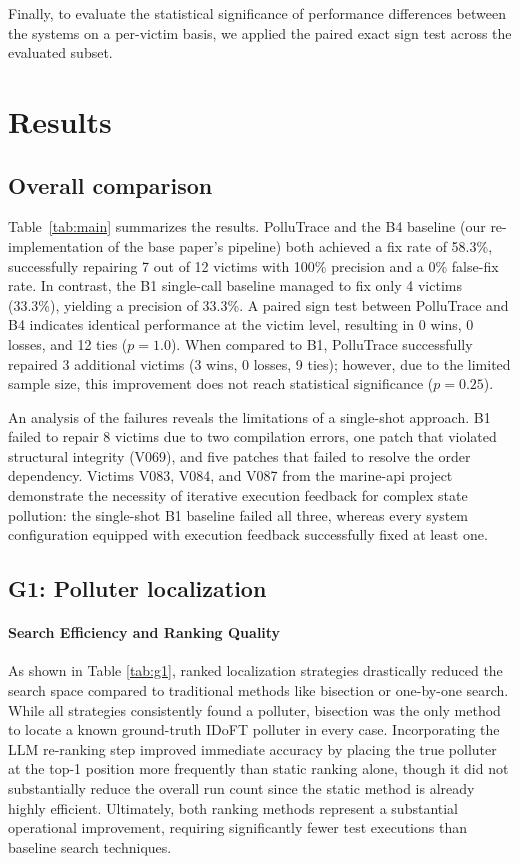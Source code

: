\documentclass[conference]{IEEEtran}
\begin{document}
Finally, to evaluate the statistical significance of performance differences between the systems on a per-victim basis, we applied the paired exact sign test across the evaluated subset.
\section{Results}
\label{sec:results}
\subsection{Overall comparison}

Table~\ref{tab:main} summarizes the results. PolluTrace and the B4 baseline (our re-implementation of the base paper's pipeline) both achieved a fix rate of 58.3\%, successfully repairing 7 out of 12 victims with 100\% precision and a 0\% false-fix rate. In contrast, the B1 single-call baseline managed to fix only 4 victims (33.3\%), yielding a precision of 33.3\%.
A paired sign test between PolluTrace and B4 indicates identical performance at the victim level, resulting in 0 wins, 0 losses, and 12 ties ($p=1.0$). When compared to B1, PolluTrace successfully repaired 3 additional victims (3 wins, 0 losses, 9 ties); however, due to the limited sample size, this improvement does not reach statistical significance ($p=0.25$).

An analysis of the failures reveals the limitations of a single-shot approach. B1 failed to repair 8 victims due to two compilation errors, one patch that violated structural integrity (V069), and five patches that failed to resolve the order dependency. Victims V083, V084, and V087 from the marine-api project demonstrate the necessity of iterative execution feedback for complex state pollution: the single-shot B1 baseline failed all three, whereas every system configuration equipped with execution feedback successfully fixed at least one.
\subsection{G1: Polluter localization}


\paragraph{Search Efficiency and Ranking Quality}
As shown in Table \ref{tab:g1}, ranked localization strategies drastically reduced the search space compared to traditional methods like bisection or one-by-one search. While all strategies consistently found a polluter, bisection was the only method to locate a known ground-truth IDoFT polluter in every case. Incorporating the LLM re-ranking step improved immediate accuracy by placing the true polluter at the top-1 position more frequently than static ranking alone, though it did not substantially reduce the overall run count since the static method is already highly efficient. Ultimately, both ranking methods represent a substantial operational improvement, requiring significantly fewer test executions than baseline search techniques.
\end{document}
